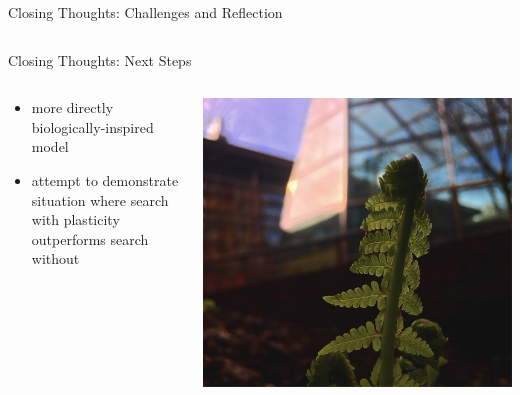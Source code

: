 \begin{frame}{Closing Thoughts: Challenges and Reflection}
\begin{columns}
\begin{column}{0.4\textwidth}
\begin{center}
\end{center}
\end{column}
\end{columns}
\end{frame}

\begin{frame}{Closing Thoughts: Next Steps}
\begin{columns}
\begin{column}{0.6\textwidth}
\begin{itemize}
\item more directly biologically-inspired model
\item attempt to demonstrate situation where search with plasticity outperforms search without
\end{itemize}
\end{column}
\begin{column}{0.4\textwidth}
\begin{center}
\includegraphics[width=\textwidth,trim={7cm 0 8cm 0},clip]{img/oppfern}
\end{center}
\end{column}
\end{columns}
\end{frame}

